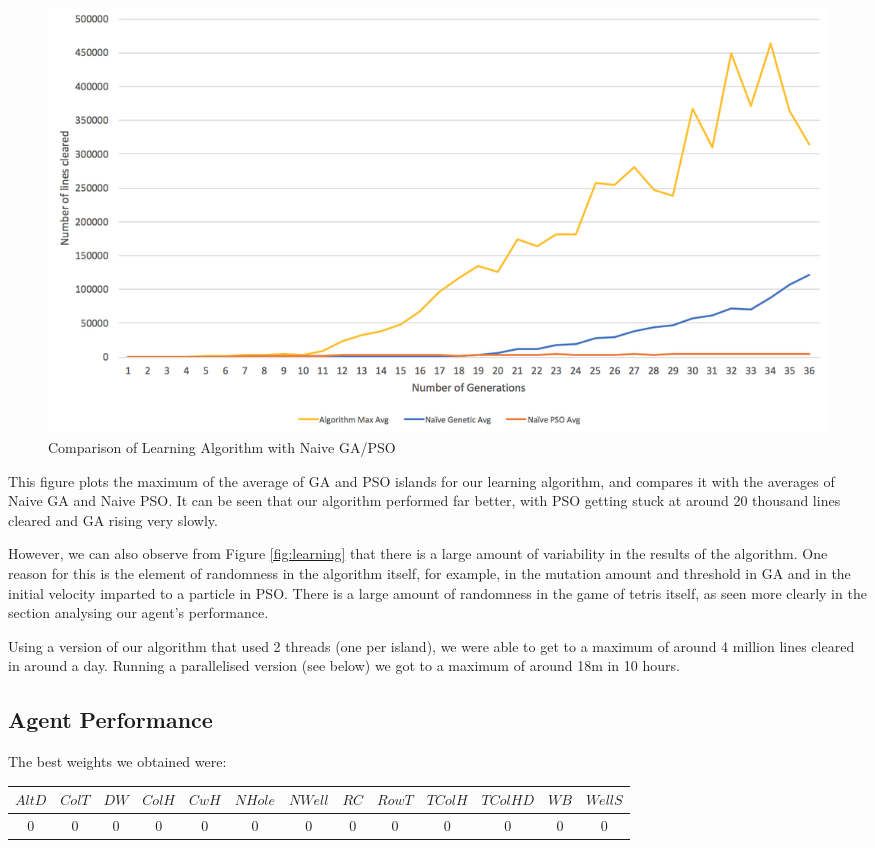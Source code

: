 \documentclass[12pt]{article}
\begin{document}
	\begin{figure}[h]
		\includegraphics[scale=0.3]{learning/Naive}
		\centering
		\caption{Comparison of Learning Algorithm with Naive GA/PSO}
		\label{fig:naive}
	\end{figure}

	This figure plots the maximum of the average of GA and PSO islands for
	our learning algorithm, and compares it with the averages of Naive GA and
	Naive PSO. It can be seen that our algorithm performed far better, with PSO
	getting stuck at around 20 thousand lines cleared and GA rising very slowly.

	However, we can also observe from Figure \ref{fig:learning} that there is a large amount
	of variability in the results of the algorithm. One reason for this is the element
	of randomness in the algorithm itself, for example, in the mutation amount and threshold
	in GA and in the initial velocity imparted to a particle in PSO. There is
	a large amount of randomness in the game of tetris itself, as seen more clearly
	in the section analysing our agent's performance.

	Using a version of our algorithm that used 2 threads (one per island),
	we were able to get to a maximum of around 4 million lines cleared in
	around a day. Running a parallelised version (see below) we got to a maximum of
	around 18m in 10 hours.\\

	\subsection{Agent Performance}
	The best weights we obtained were:\\

	\begin{tabular}{ | c | c | c | c | c | c | c | c | c | c | c | c | c | }
		\hline
		$AltD$ & $ColT$ & $DW$ & $ColH$ & $CwH$ & $NHole$ & $NWell$ & $RC$ & $RowT$ & $TColH$ & $TColHD$ & $WB$ & $WellS$ \\ \hline
		0 & 0 & 0 & 0 & 0 & 0 & 0 & 0 & 0 & 0 & 0 & 0 & 0 \\ \hline
	\end{tabular}\\[0.25em]
\end{document}
